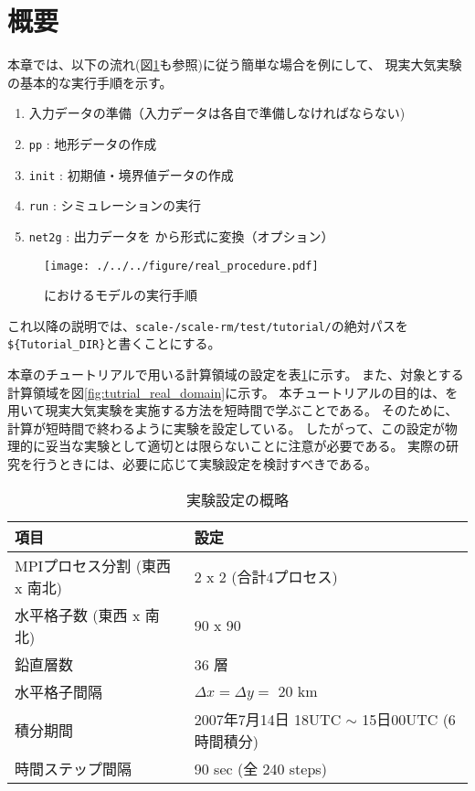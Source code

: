 \section{概要} \label{sec:tutrial_real_intro}
本章では、以下の流れ(図\ref{fig:howto}も参照)に従う簡単な場合を例にして、
現実大気実験の基本的な実行手順を示す。
\begin{enumerate}
\item  入力データの準備（入力データは各自で準備しなければならない)
\item  \texttt{pp}      : 地形データの作成
\item  \texttt{init}    : 初期値・境界値データの作成
\item  \texttt{run}     : シミュレーションの実行
\item  \texttt{net2g}   : 出力データを \netcdf から\grads 形式に変換（オプション）
\end{enumerate}

\begin{figure}[b]
\begin{center}
  \texttt{[image: ./../../figure/real\_procedure.pdf]}\\
  \caption{\scalerm におけるモデルの実行手順}
  \label{fig:howto}
\end{center}
\end{figure}

これ以降の説明では、\texttt{scale-{\version}/scale-rm/test/tutorial/}の絶対パスを
\verb|${Tutorial_DIR}|と書くことにする。

本章のチュートリアルで用いる計算領域の設定を表\ref{tab:grids}に示す。
また、対象とする計算領域を図\ref{fig:tutrial_real_domain}に示す。
本チュートリアルの目的は、\scalerm を用いて現実大気実験を実施する方法を短時間で学ぶことである。
そのために、計算が短時間で終わるように実験を設定している。
したがって、この設定が物理的に妥当な実験として適切とは限らないことに注意が必要である。
実際の研究を行うときには、必要に応じて実験設定を検討すべきである。

\begin{table}[h]
\begin{center}
  \caption{実験設定の概略}
  \label{tab:grids}
  \begin{tabularx}{150mm}{|l|X|} \hline
    \rowcolor[gray]{0.9} 項目 & 設定 \\ \hline
    MPIプロセス分割 (東西 x 南北) & 2 x 2 (合計4プロセス) \\ \hline
    水平格子数 (東西 x 南北) & 90 x 90 \\ \hline
    鉛直層数                 & 36 層                  \\ \hline
    水平格子間隔             & $\Delta x = \Delta y =$ 20 km       \\ \hline
    積分期間 & 2007年7月14日 18UTC $\sim$ 15日00UTC (6時間積分) \\ \hline
    時間ステップ間隔 & 90 sec (全 240 steps) \\ \hline
  \end{tabularx}
\end{center}
\end{table}

